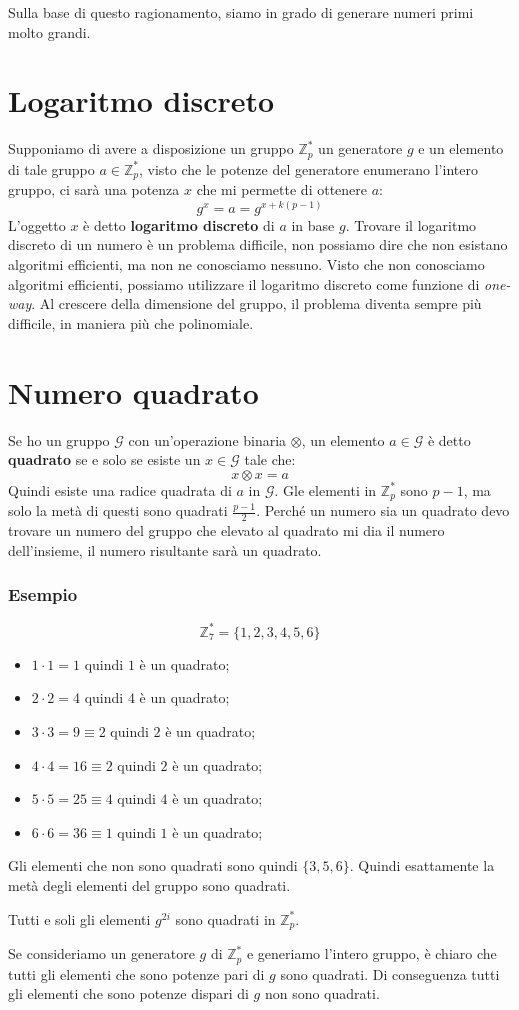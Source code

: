 Sulla base di questo ragionamento, siamo in grado di generare numeri primi molto grandi.
\section{Logaritmo discreto}
Supponiamo di avere a disposizione un gruppo $\mathbb{Z}_p^*$ un generatore $g$ e un 
elemento di tale gruppo $a \in \mathbb{Z}_p^*$, visto che le potenze del generatore enumerano 
l'intero gruppo, ci sarà una potenza $x$ che mi permette di ottenere $a$:
\[
  g^x = a = g^{x+k(p-1)}
\]
L'oggetto $x$ è detto \textbf{logaritmo discreto} di $a$ in base $g$.
Trovare il logaritmo discreto di un numero è un problema difficile, non possiamo dire che non esistano 
algoritmi efficienti, ma non ne conosciamo nessuno.
Visto che non conosciamo algoritmi efficienti, possiamo utilizzare il logaritmo discreto come
funzione di \textit{one-way}. Al crescere della dimensione del gruppo, il problema diventa
sempre più difficile, in maniera più che polinomiale.

\section{Numero quadrato}
Se ho un gruppo $\mathcal{G}$ con un'operazione binaria $\otimes$, un elemento $a \in \mathcal{G}$
è detto \textbf{quadrato} se e solo se esiste un $x \in \mathcal{G}$ tale che:
\[
  x \otimes x = a
\]
Quindi esiste una radice quadrata di $a$ in $\mathcal{G}$.
Gle elementi in $\mathbb{Z}_p^*$ sono $p-1$, ma solo la metà di questi sono quadrati $\frac{p-1}{2}$.
Perché un numero sia un quadrato devo trovare un numero del gruppo 
che elevato al quadrato mi dia il numero dell'insieme, il numero risultante sarà un quadrato.
\subsubsection{Esempio}
\[
  \mathbb{Z}_7^* = \{1,2,3,4,5,6\}
\]
\begin{itemize}
  \item $1 \cdot 1 = 1$ quindi $1$ è un quadrato;
  \item $2 \cdot 2 = 4$ quindi $4$ è un quadrato;
  \item $3 \cdot 3 = 9 \equiv 2$ quindi $2$ è un quadrato;
  \item $4 \cdot 4 = 16 \equiv 2$ quindi $2$ è un quadrato;
  \item $5 \cdot 5 = 25 \equiv 4$ quindi $4$ è un quadrato;
  \item $6 \cdot 6 = 36 \equiv 1$ quindi $1$ è un quadrato;
\end{itemize}
Gli elementi che non sono quadrati sono quindi $\{3,5,6\}$. Quindi esattamente la metà
degli elementi del gruppo sono quadrati. 
\begin{theorem}
  Tutti e soli gli elementi $g^{2i}$ sono quadrati in $\mathbb{Z}_p^*$.
\end{theorem}
Se consideriamo un generatore $g$ di $\mathbb{Z}_p^*$ e generiamo l'intero gruppo,
è chiaro che tutti gli elementi che sono potenze pari di $g$ sono quadrati.
Di conseguenza tutti gli elementi che sono potenze dispari di $g$ non sono quadrati.


